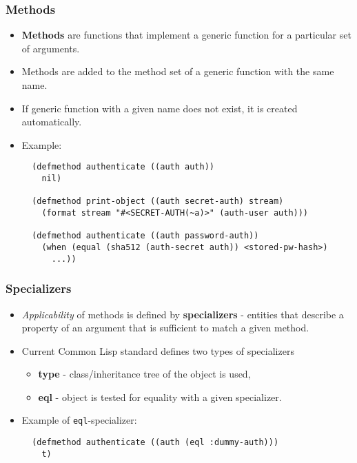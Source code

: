 \documentclass{beamer}
\begin{document}
\begin{frame}[fragile]
  \frametitle{Methods}
  \begin{itemize}
  \item \textbf{Methods} are functions that implement a generic function for a
    particular set of arguments.
  \item Methods are added to the method set of a generic function with the same
    name.
  \item If generic function with a given name does not exist, it is created
    automatically.
  \item Example:
\begin{verbatim}
  (defmethod authenticate ((auth auth))
    nil)

  (defmethod print-object ((auth secret-auth) stream)
    (format stream "#<SECRET-AUTH(~a)>" (auth-user auth)))

  (defmethod authenticate ((auth password-auth))
    (when (equal (sha512 (auth-secret auth)) <stored-pw-hash>)
      ...))

\end{verbatim}    
  \end{itemize}
\end{frame}

\begin{frame}[fragile]
  \frametitle{Specializers}
  \begin{itemize}
  \item \textit{Applicability} of methods is defined by \textbf{specializers} -
    entities that describe a property of an argument that is sufficient to match
    a given method.
  \item Current Common Lisp standard defines two types of specializers
    \begin{itemize}
    \item \textbf{type} - class/inheritance tree of the object is used,
    \item \textbf{eql} - object is tested for equality with a given specializer.
    \end{itemize}
  \item Example of \texttt{eql}-specializer:
\begin{verbatim}
  (defmethod authenticate ((auth (eql :dummy-auth)))
    t)
\end{verbatim}
  \end{itemize}
\end{frame}
\end{document}
